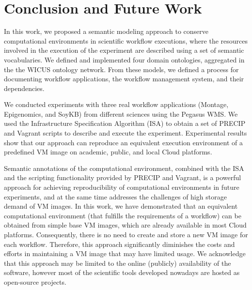 \section{Conclusion and Future Work}
\label{sec:conclusion}

In this work, we proposed a semantic modeling approach to conserve 
computational environments in scientific workflow executions, where  
the resources involved in the execution of the experiment are described 
using a set of semantic vocabularies. We defined and implemented four 
domain ontologies, aggregated in the the WICUS ontology network. From 
these models, we defined a process for documenting workflow applications, 
the workflow management system, and their dependencies.

We conducted experiments with three real workflow applications (Montage, 
Epigenomics, and SoyKB) from different sciences using the Pegasus WMS. 
We used the Infrastructure Specification Algorithm (ISA) to obtain a set of 
PRECIP and Vagrant scripts to describe and execute the experiment. 
Experimental results show that our approach can reproduce an equivalent 
execution environment of a predefined VM image on academic, public, and 
local Cloud platforms.


Semantic annotations of the computational environment, combined with the 
ISA and the scripting functionality provided by PRECIP and Vagrant, is a 
powerful approach for achieving reproducibility of computational environments 
in future experiments, and at the same time addresses the challenges of high 
storage demand of VM images. In this work, we have demonstrated that
an equivalent computational environment (that fulfills the requirements of a
workflow) can be obtained from simple base VM images, which are already 
available in most Cloud platforms. Consequently, there is no need to create 
and store a new VM image for each workflow. Therefore, this approach 
significantly diminishes the costs and efforts in maintaining a VM image that 
may have limited usage. We acknowledge that this approach may be limited 
to the online (publicly) availability of the software, however most of the scientific
tools developed nowadays are hosted as open-source projects.



